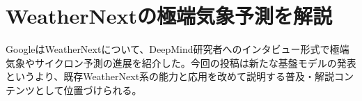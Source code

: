 \section{WeatherNextの極端気象予測を解説}
GoogleはWeatherNextについて、DeepMind研究者へのインタビュー形式で極端気象やサイクロン予測の進展を紹介した。今回の投稿は新たな基盤モデルの発表というより、既存WeatherNext系の能力と応用を改めて説明する普及・解説コンテンツとして位置づけられる。
